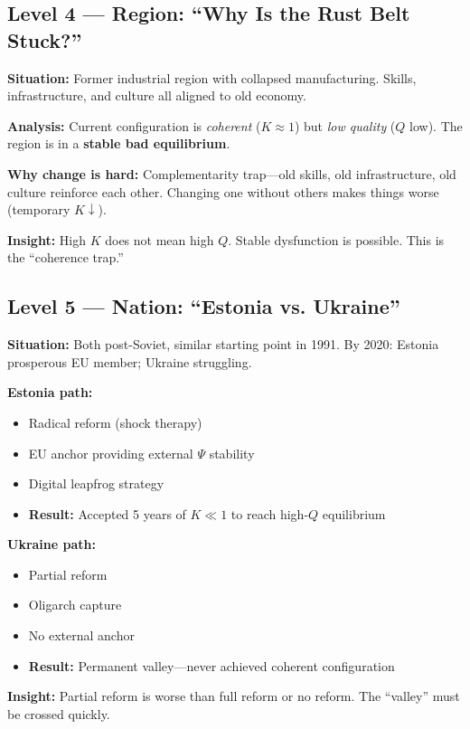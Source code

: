 \subsection{Level 4 — Region: ``Why Is the Rust Belt Stuck?''}

\begin{tcolorbox}[colback=orange!5!white, colframe=orange!75!black,
    title=\textbf{Worked Example L=4: Regional Lock-In}]

\textbf{Situation:} Former industrial region with collapsed manufacturing.
Skills, infrastructure, and culture all aligned to old economy.

\textbf{Analysis:}
Current configuration is \emph{coherent} ($K \approx 1$) but \emph{low quality} ($Q$ low).
The region is in a \textbf{stable bad equilibrium}.

\textbf{Why change is hard:}
Complementarity trap—old skills, old infrastructure, old culture reinforce each other.
Changing one without others makes things worse (temporary $K \downarrow$).

\textbf{Insight:} High $K$ does not mean high $Q$. Stable dysfunction is possible.
This is the ``coherence trap.''

\end{tcolorbox}

\subsection{Level 5 — Nation: ``Estonia vs. Ukraine''}

\begin{tcolorbox}[colback=orange!5!white, colframe=orange!75!black,
    title=\textbf{Worked Example L=5: National Transformation}]

\textbf{Situation:} Both post-Soviet, similar starting point in 1991.
By 2020: Estonia prosperous EU member; Ukraine struggling.

\textbf{Estonia path:}
\begin{itemize}[nosep]
    \item Radical reform (shock therapy)
    \item EU anchor providing external $\Psi$ stability
    \item Digital leapfrog strategy
    \item \textbf{Result:} Accepted 5 years of $K \ll 1$ to reach high-$Q$ equilibrium
\end{itemize}

\textbf{Ukraine path:}
\begin{itemize}[nosep]
    \item Partial reform
    \item Oligarch capture
    \item No external anchor
    \item \textbf{Result:} Permanent valley—never achieved coherent configuration
\end{itemize}

\textbf{Insight:} Partial reform is worse than full reform or no reform.
The ``valley'' must be crossed quickly.

\end{tcolorbox}

